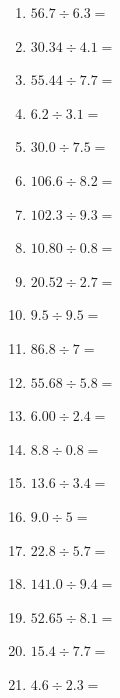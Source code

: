 \documentclass[12pt]{article}
\begin{document}
\begin{enumerate}
\item \large $ 56.7 \div 6.3 = $ \vspace{1.5cm}
\newpage
\item \large $ 30.34 \div 4.1 = $ \vspace{1.5cm}
\item \large $ 55.44 \div 7.7 = $ \vspace{1.5cm}
\item \large $ 6.2 \div 3.1 = $ \vspace{1.5cm}
\item \large $ 30.0 \div 7.5 = $ \vspace{1.5cm}
\item \large $ 106.6 \div 8.2 = $ \vspace{1.5cm}
\item \large $ 102.3 \div 9.3 = $ \vspace{1.5cm}
\item \large $ 10.80 \div 0.8 = $ \vspace{1.5cm}
\item \large $ 20.52 \div 2.7 = $ \vspace{1.5cm}
\item \large $ 9.5 \div 9.5 = $ \vspace{1.5cm}
\item \large $ 86.8 \div 7 = $ \vspace{1.5cm}
\newpage
\item \large $ 55.68 \div 5.8 = $ \vspace{1.5cm}
\item \large $ 6.00 \div 2.4 = $ \vspace{1.5cm}
\item \large $ 8.8 \div 0.8 = $ \vspace{1.5cm}
\item \large $ 13.6 \div 3.4 = $ \vspace{1.5cm}
\item \large $ 9.0 \div 5 = $ \vspace{1.5cm}
\item \large $ 22.8 \div 5.7 = $ \vspace{1.5cm}
\item \large $ 141.0 \div 9.4 = $ \vspace{1.5cm}
\item \large $ 52.65 \div 8.1 = $ \vspace{1.5cm}
\item \large $ 15.4 \div 7.7 = $ \vspace{1.5cm}
\item \large $ 4.6 \div 2.3 = $ \vspace{1.5cm}

\end{enumerate}
\end{document}
